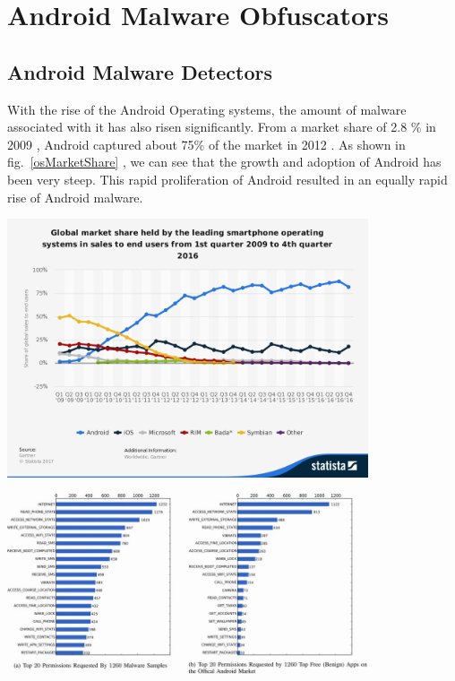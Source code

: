 \chapter{Android Malware Obfuscators}

\section{Android Malware Detectors}
With the rise of the Android Operating systems, the amount of malware associated with it has also risen significantly. From a market share of 2.8 \% in 2009 \cite{androidShare2009} , Android captured about 75\% of the market in 2012 \cite{androidShare2009}. As shown in fig.~\ref{osMarketShare} , we can see that the growth and adoption of Android has been very steep. This rapid proliferation of Android resulted in an equally rapid rise of Android malware.

  \vspace{3mm}
  \begin{center}
  	\includegraphics[width=0.8\textwidth]{OS_Market_Share.png}
  	\label{osMarketShare}
  \end{center}
  \vspace{3mm}
  
  
   \vspace{3mm}
   \begin{center}
   	\includegraphics[width=0.8\textwidth]{permissionsList1.png}
   	\label{permissionsAndroid}
   \end{center}
   \vspace{3mm}
   

